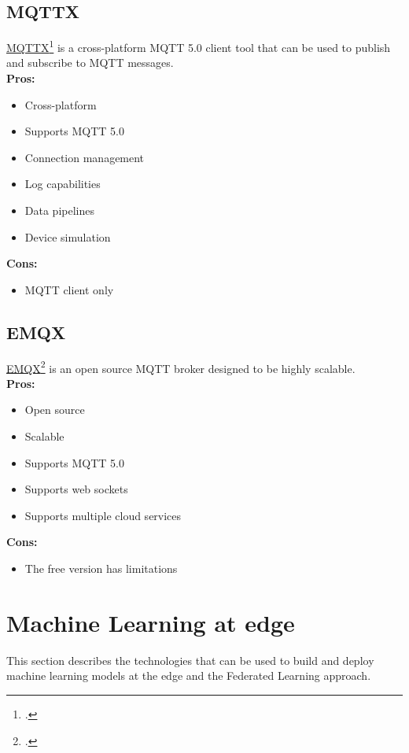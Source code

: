 \subsection{MQTTX}
\label{mqttx}
\href{https://mqttx.app/}{MQTTX}\footcite{site:mqttx} is a cross-platform MQTT 5.0 client tool that can be used to publish and subscribe to MQTT messages.\\
\textbf{Pros:}
\begin{itemize}
    \item Cross-platform
    \item Supports MQTT 5.0
    \item Connection management
    \item Log capabilities
    \item Data pipelines
    \item Device simulation
\end{itemize}
\textbf{Cons:}
\begin{itemize}
    \item MQTT client only
\end{itemize}

\subsection{EMQX}
\label{emqx}
\href{https://www.emqx.io/}{EMQX}\footcite{site:emqx} is an open source MQTT broker designed to be highly scalable.\\
\textbf{Pros:}
\begin{itemize}
    \item Open source
    \item Scalable
    \item Supports MQTT 5.0
    \item Supports web sockets
    \item Supports multiple cloud services
\end{itemize}
\textbf{Cons:}
\begin{itemize}
    \item The free version has limitations
\end{itemize}

\section{Machine Learning at edge} 
This section describes the technologies that can be used to build and deploy machine learning models at the edge and the Federated Learning approach.

